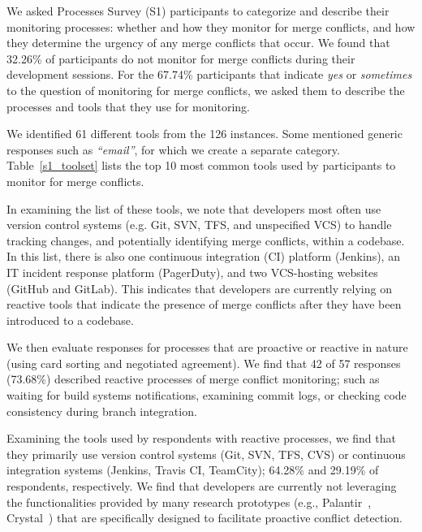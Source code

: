 We asked Processes Survey (S1) participants to categorize and describe their monitoring processes: whether and how they monitor for merge conflicts, and how they determine the urgency of any merge conflicts that occur.
We found that 32.26\% of participants do not monitor for merge conflicts during their development sessions.
For the 67.74\% participants that indicate \textit{yes} or \textit{sometimes} to the question of monitoring for merge conflicts, we asked them to describe the processes and tools that they use for monitoring.

We identified 61 different tools from the 126 instances.
Some mentioned generic responses such as \textit{``email''}, for which we create a separate category.
Table~\ref{s1_toolset} lists the top 10 most common tools used by participants to monitor for merge conflicts.

In examining the list of these tools, we note that developers most often use version control systems (e.g. Git, SVN, TFS, and unspecified VCS) to handle tracking changes, and potentially identifying merge conflicts, within a codebase.
In this list, there is also one continuous integration (CI) platform (Jenkins), an IT incident response platform (PagerDuty), and two VCS-hosting websites (GitHub and GitLab).
This indicates that developers are currently relying on reactive tools that indicate the presence of merge conflicts after they have been introduced to a codebase.

We then evaluate responses for processes that are proactive or reactive in nature (using card sorting and negotiated agreement).
We find that 42 of 57 responses (73.68\%) described reactive processes of merge conflict monitoring; such as waiting for build systems notifications, examining commit logs, or checking code consistency during branch integration.

Examining the tools used by respondents with reactive processes, we find that they primarily use version control systems (Git, SVN, TFS, CVS) or continuous integration systems (Jenkins, Travis CI, TeamCity); 64.28\% and 29.19\% of respondents, respectively.
We find that developers are currently not leveraging the functionalities provided by many research prototypes (e.g., Palantir~\cite{palantir}, Crystal~\cite{Brun2011}) that are specifically designed to facilitate proactive conflict detection.

